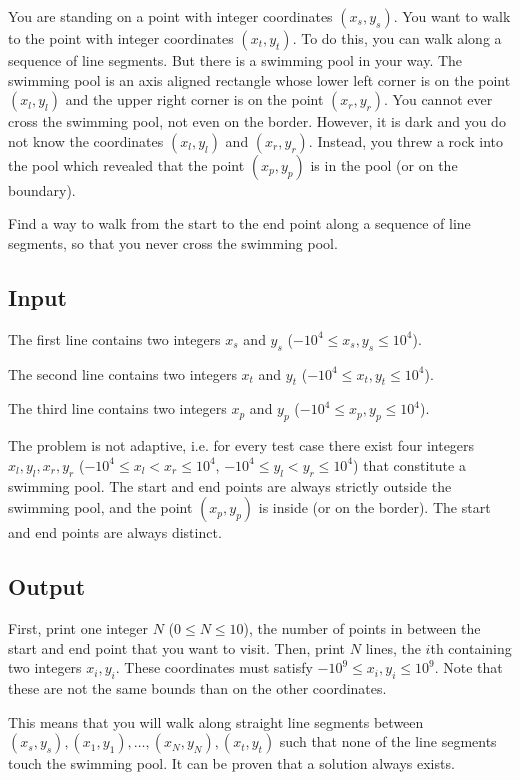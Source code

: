 

You are standing on a point with integer coordinates $(x_s, y_s)$. 
You want to walk to the point with integer coordinates $(x_t, y_t)$. 
To do this, you can walk along a sequence of line segments. 
But there is a swimming pool in your way. The swimming pool is an axis aligned 
rectangle whose lower left corner is on the point $(x_l, y_l)$ and the upper right 
corner is on the point $(x_r, y_r)$. You cannot ever cross the swimming pool, 
not even on the border. However, it is dark and you do not know the 
coordinates $(x_l, y_l)$ and $(x_r, y_r)$. Instead, you threw a rock into the pool which 
revealed that the point $(x_p, y_p)$ is in the pool (or on the boundary).

Find a way to walk from the start to the end point along a sequence of line segments, 
so that you never cross the swimming pool.

\subsection*{Input}
The first line contains two integers $x_s$ and $y_s$ ($-10^4 \leq x_s, y_s \leq 10^4$).

The second line contains two integers $x_t$ and $y_t$ ($-10^4 \leq x_t, y_t \leq 10^4$).

The third line contains two integers $x_p$ and $y_p$ ($-10^4 \leq x_p, y_p \leq 10^4$).

The problem is not adaptive, i.e. for every test case there exist four integers 
$x_l, y_l, x_r, y_r$ ($-10^4 \leq x_l < x_r \leq 10^4$, $-10^4 \leq y_l < y_r \leq 10^4$) 
that constitute a swimming pool. 
The start and end points are always strictly outside the swimming pool, and the point $(x_p,y_p)$
is inside (or on the border). The start and end points are always distinct.


\subsection*{Output}
First, print one integer $N$ ($0 \leq N \leq 10$), the number of points in between 
the start and end point that you want to visit. Then, print $N$ lines, the $i$th 
containing two integers $x_i, y_i$. 
These coordinates must satisfy $-10^9 \leq x_i, y_i \leq 10^9$. Note that these are not 
the same bounds than on the other coordinates.

This means that you will walk along straight 
line segments between $(x_s, y_s), (x_1, y_1), \dots, (x_N, y_N), (x_t, y_t)$ 
such that none of the line segments touch the swimming pool. It can be proven that a solution
always exists.
